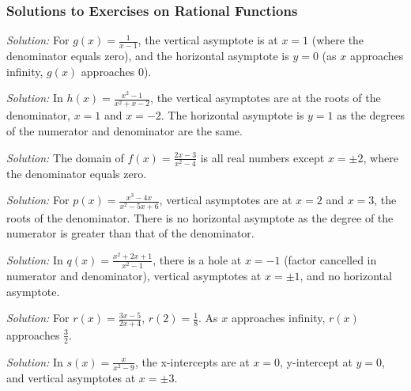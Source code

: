 \documentclass[a4paper,12pt]{book}
\newenvironment{solution}[1][]
{\par\noindent\textit{Solution:} \rmfamily}{\medskip}
\begin{document}
\subsubsection*{Solutions to Exercises on Rational Functions}

\begin{solution}[1]
For \( g(x) = \frac{1}{x - 1} \), the vertical asymptote is at \( x = 1 \) (where the denominator equals zero), and the horizontal asymptote is \( y = 0 \) (as \( x \) approaches infinity, \( g(x) \) approaches 0).
\end{solution}

\begin{solution}[2]
In \( h(x) = \frac{x^2 - 1}{x^2 + x - 2} \), the vertical asymptotes are at the roots of the denominator, \( x = 1 \) and \( x = -2 \). The horizontal asymptote is \( y = 1 \) as the degrees of the numerator and denominator are the same.
\end{solution}

\begin{solution}[3]
The domain of \( f(x) = \frac{2x - 3}{x^2 - 4} \) is all real numbers except \( x = \pm 2 \), where the denominator equals zero.
\end{solution}

\begin{solution}[4]
For \( p(x) = \frac{x^3 - 4x}{x^2 - 5x + 6} \), vertical asymptotes are at \( x = 2 \) and \( x = 3 \), the roots of the denominator. There is no horizontal asymptote as the degree of the numerator is greater than that of the denominator.
\end{solution}

\begin{solution}[5]
In \( q(x) = \frac{x^2 + 2x + 1}{x^2 - 1} \), there is a hole at \( x = -1 \) (factor cancelled in numerator and denominator), vertical asymptotes at \( x = \pm 1 \), and no horizontal asymptote.
\end{solution}

\begin{solution}[6]
For \( r(x) = \frac{3x - 5}{2x + 4} \), \( r(2) = \frac{1}{8} \). As \( x \) approaches infinity, \( r(x) \) approaches \( \frac{3}{2} \).
\end{solution}

\begin{solution}[7]
In \( s(x) = \frac{x}{x^2 - 9} \), the x-intercepts are at \( x = 0 \), y-intercept at \( y = 0 \), and vertical asymptotes at \( x = \pm 3 \).
\end{solution}
\end{document}
